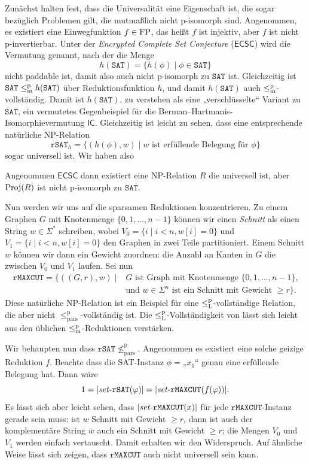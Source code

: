 Zunächst halten \textcite{agrawal_universal_1992} fest, dass die Universalität eine Eigenschaft ist, die sogar bezüglich Problemen gilt, die mutmaßlich nicht p-isomorph sind.
Angenommen, es existiert eine Einwegfunktion $f\in\mathrm{FP}$, das heißt $f$ ist injektiv, aber $f$ ist nicht p-invertierbar.
Unter der \emph{Encrypted Complete Set Conjecture} ($\mathsf{ECSC}$) wird die Vermutung genannt, nach der die Menge
\[ h(\mathtt{SAT}) = \{ h(\phi) \mid \phi\in\mathtt{SAT} \} \]
nicht paddable ist, damit also auch nicht p-isomorph zu $\mathtt{SAT}$ ist.
Gleichzeitig ist $\mathtt{SAT}\leq_\mathrm{m}^\mathrm{p} h(\mathtt{SAT})$ über Reduktionsfunktion $h$, und damit $h(\mathtt{SAT})$ auch $\leq_\mathrm{m}^\mathrm{p}$-vollständig.
Damit ist $h(\mathtt{SAT})$, zu verstehen als eine „verschlüsselte“ Variant zu $\mathtt{SAT}$, ein vermutetes Gegenbeispiel für die Berman--Hartmanis-Isomorphievermutung $\mathsf{IC}$.
Gleichzeitig ist leicht zu sehen, dass eine entsprechende natürliche NP-Relation
\[ \mathtt{rSAT}_h = \{ (h(\phi), w) \mid \text{$w$ ist erfüllende Belegung für $\phi$} \} \]
sogar universell ist.
Wir haben also
\begin{observation}
    Angenommen $\mathsf{ECSC}$ dann existiert eine NP-Relation $R$ die universell ist, aber $\operatorname{Proj}(R)$ ist nicht p-isomorph zu $\mathtt{SAT}$.
\end{observation}


Nun werden wir uns auf die sparsamen Reduktionen konzentrieren.
Zu einem Graphen $G$ mit Knotenmenge $\{0,1,\dots, n-1\}$ können wir einen \emph{Schnitt} als einen String $w\in\Sigma^*$ schreiben, wobei $V_0 = \{ i \mid i<n, w[i]=0\}$ und $V_1 = \{ i \mid i<n, w[i]=0\}$ den Graphen in zwei Teile partitioniert. Einem Schnitt $w$ können wir dann ein Gewicht zuordnen: die Anzahl an Kanten in $G$ die zwischen $V_0$ und $V_1$ laufen.
Sei nun
\[ \begin{split} \mathtt{rMAXCUT} = \{ ((G, r), w) \mid {}&\text{$G$ ist Graph mit Knotenmenge $\{0,1,\dots,n-1\}$,} \\ &\text{und $w\in\Sigma^n$ ist ein Schnitt mit Gewicht $\geq r$} \}.\end{split} \]
Diese natürliche NP-Relation ist ein Beispiel für eine $\leq_\mathrm{L}^\mathrm{p}$-vollständige Relation, die aber nicht $\leq_\mathrm{pars}^\mathrm p$-vollständig ist. Die $\leq_\mathrm{L}^\mathrm{p}$-Vollständigkeit von lässt sich leicht aus den üblichen $\leq_\mathrm{m}^\mathrm{p}$-Reduktionen verstärken.

Wir behaupten nun dass $\mathtt{rSAT} \not\leq_\mathrm{pars}^\mathrm p$. Angenommen es existiert eine solche geizige Reduktion $f$. Beachte dass die SAT-Instanz $\phi={}$„$x_1$“ genau eine erfüllende Belegung hat. Dann wäre
\[ 1=|\mathit{set}\text{-}{}\mathtt{rSAT}(\varphi)|=|\mathit{set}\text{-}{}\mathtt{rMAXCUT}(f(\varphi))|. \]
Es lässt sich aber leicht sehen, dass $|\mathit{set}\text{-}{}\mathtt{rMAXCUT}(x)|$ für jede $\mathtt{rMAXCUT}$-Instanz gerade sein muss: ist $w$ Schnitt mit Gewicht $\geq r$, dann ist auch der komplementäre String $\overline{w}$ auch ein Schnitt mit Gewicht $\geq r$; die Mengen $V_0$ und $V_1$ werden einfach vertauscht.
Damit erhalten wir den Widerspruch. Auf ähnliche Weise lässt sich zeigen, dass $\mathtt{rMAXCUT}$ auch nicht universell sein kann.

